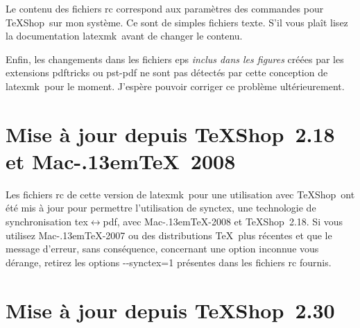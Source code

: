 \documentclass[11pt,french]{article}
\newcommand{\MacTeX}{Mac\kern-.13em\TeX}
\newcommand{\TS}{\textsf{\TeX Shop}}
\newcommand{\latexmk}{\textsf{latexmk}}
\newcommand{\mnu}[1]{\textsf{#1}}
\newcommand{\cmd}[1]{\textsf{#1}}
\begin{document}
Le contenu des fichiers \cmd{rc} correspond aux paramètres des commandes pour \TS\ sur mon système. Ce sont de simples fichiers texte. S'il vous plaît lisez la documentation \latexmk\ avant de changer le contenu.

Enfin, les changements dans les fichiers \cmd{eps} \emph{inclus dans les figures} créées par les extensions \cmd{pdftricks} ou \cmd{pst-pdf} ne sont pas détectés par cette conception de \latexmk\ pour le moment. J'espère pouvoir corriger ce problème ultérieurement.

%

\section{Mise à jour depuis \TS\ 2.18 et \MacTeX\ 2008}

Les fichiers \cmd{rc} de cette version de \latexmk\ pour une utilisation avec \TS\ ont été mis à jour pour permettre l'utilisation de \cmd{synctex}, une technologie de synchronisation \cmd{tex\(\leftrightarrow\)pdf}, avec \cmd{\MacTeX-2008} et \TS\ 2.18. Si vous utilisez \cmd{\MacTeX-2007} ou des distributions \TeX\ plus récentes et que le message d'erreur, sans conséquence, concernant une option inconnue vous dérange, retirez les options \cmd{-{}-synctex=1} présentes dans les fichiers \cmd{rc} fournis.

%

\section{Mise à jour depuis \TS\ 2.30}
\end{document}
